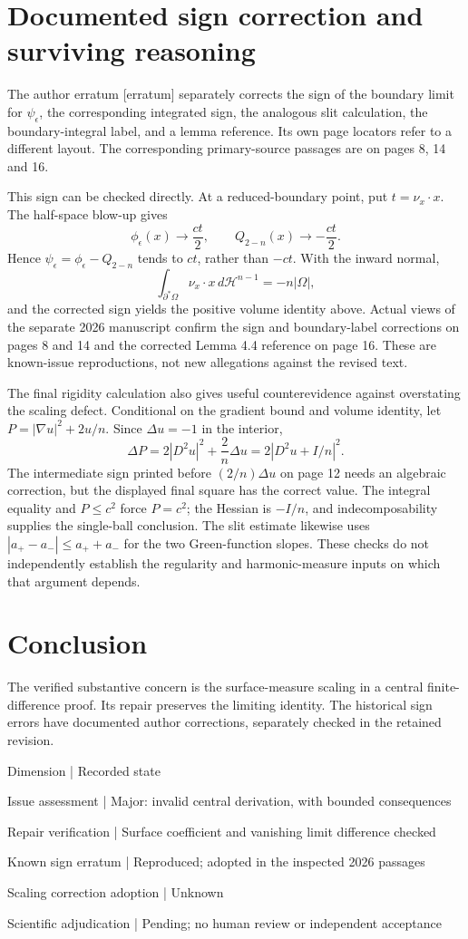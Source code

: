 \documentclass[10pt]{article}
\begin{document}
\section*{Documented sign correction and surviving reasoning}
The author erratum [erratum] separately corrects the sign of the boundary limit for \(\psi_\epsilon\), the corresponding integrated sign, the analogous slit calculation, the boundary-integral label, and a lemma reference. Its own page locators refer to a different layout. The corresponding primary-source passages are on pages 8, 14 and 16.\par
This sign can be checked directly. At a reduced-boundary point, put \(t=\nu_x\cdot x\). The half-space blow-up gives \[\phi_\epsilon(x)\longrightarrow \frac{ct}{2},
 \qquad
 Q_{2-n}(x)\longrightarrow-\frac{ct}{2}.\] Hence \(\psi_\epsilon=\phi_\epsilon-Q_{2-n}\) tends to \(ct\), rather than \(-ct\). With the inward normal, \[\int_{\partial^*\Omega}\nu_x\cdot x\,d\mathcal H^{n-1}=-n|\Omega|,\] and the corrected sign yields the positive volume identity above. Actual views of the separate 2026 manuscript confirm the sign and boundary-label corrections on pages 8 and 14 and the corrected Lemma 4.4 reference on page 16. These are known-issue reproductions, not new allegations against the revised text.\par
The final rigidity calculation also gives useful counterevidence against overstating the scaling defect. Conditional on the gradient bound and volume identity, let \(P=|\nabla u|^2+2u/n\). Since \(\Delta u=-1\) in the interior, \[\Delta P
 =2|D^2u|^2+\frac2n\Delta u
 =2|D^2u+I/n|^2.\] The intermediate sign printed before \((2/n)\Delta u\) on page 12 needs an algebraic correction, but the displayed final square has the correct value. The integral equality and \(P\leq c^2\) force \(P=c^2\); the Hessian is \(-I/n\), and indecomposability supplies the single-ball conclusion. The slit estimate likewise uses \(|a_+-a_-|\leq a_++a_-\) for the two Green-function slopes. These checks do not independently establish the regularity and harmonic-measure inputs on which that argument depends.\par
\section*{Conclusion}
The verified substantive concern is the surface-measure scaling in a central finite-difference proof. Its repair preserves the limiting identity. The historical sign errors have documented author corrections, separately checked in the retained revision.\par
Dimension | Recorded state\par
Issue assessment | Major: invalid central derivation, with bounded consequences\par
Repair verification | Surface coefficient and vanishing limit difference checked\par
Known sign erratum | Reproduced; adopted in the inspected 2026 passages\par
Scaling correction adoption | Unknown\par
Scientific adjudication | Pending; no human review or independent acceptance\par
\end{document}
